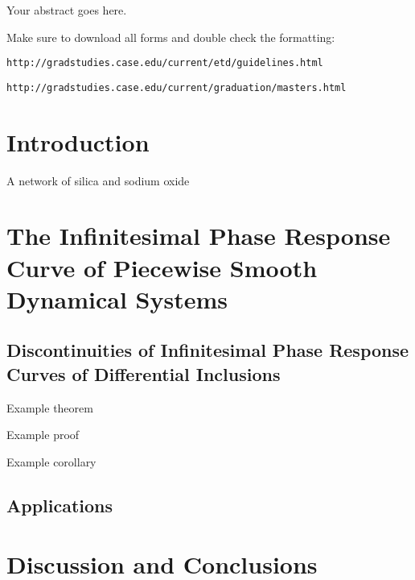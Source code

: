 \documentclass[12pt]{article}
\newenvironment{proof}[1][Proof]{\begin{trivlist}
\item[\hskip \labelsep {\bfseries #1}]}{\end{trivlist}}
\newcommand{\qed}{\nobreak \ifvmode \relax \else
      \ifdim\lastskip<1.5em \hskip-\lastskip
      \hskip1.5em plus0em minus0.5em \fi \nobreak
      \vrule height0.75em width0.5em depth0.25em\fi}
\begin{document}
Your abstract goes here.

Make sure to download all forms and double check the formatting:
\begin{verbatim}http://gradstudies.case.edu/current/etd/guidelines.html\end{verbatim}
\begin{verbatim}http://gradstudies.case.edu/current/graduation/masters.html\end{verbatim}
\newpage



\section{Introduction}
A network of silica and sodium oxide \cite{Glass1973103}
\newpage
\section[The iPRC of Piecewise Smooth Dynamical Systems]{The Infinitesimal Phase Response Curve of Piecewise Smooth Dynamical Systems}

\subsection{Discontinuities of Infinitesimal Phase Response Curves of Differential Inclusions}

\begin{theorem}
Example theorem
\end{theorem}

\begin{proof}
Example proof \qed
\end{proof}

\begin{corollary}
Example corollary
\end{corollary}

\subsection{Applications}


\section{Discussion and Conclusions}


\newpage
\appendix
\end{document}
